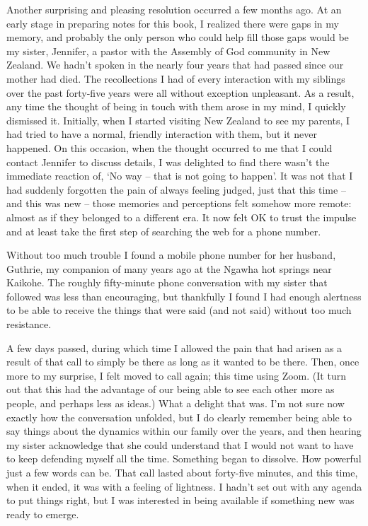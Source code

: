 Another surprising and pleasing resolution occurred a few months ago. At
an early stage in preparing notes for this book, I realized there were
gaps in my memory, and probably the only person who could help fill
those gaps would be my sister, Jennifer, a pastor with the Assembly of
God community in New Zealand. We hadn't spoken in the nearly four years
that had passed since our mother had died. The recollections I had of
every interaction with my siblings over the past forty-five years were
all without exception unpleasant. As a result, any time the thought of
being in touch with them arose in my mind, I quickly dismissed it.
Initially, when I started visiting New Zealand to see my parents, I had
tried to have a normal, friendly interaction with them, but it never
happened. On this occasion, when the thought occurred to me that I could
contact Jennifer to discuss details, I was delighted to find there
wasn't the immediate reaction of, `No way -- that is not going to
happen'. It was not that I had suddenly forgotten the pain of always
feeling judged, just that this time -- and this was new -- those
memories and perceptions felt somehow more remote: almost as if they
belonged to a different era. It now felt OK to trust the impulse and at
least take the first step of searching the web for a phone number.

Without too much trouble I found a mobile phone number for her husband,
Guthrie, my companion of many years ago at the Ngawha hot springs near
Kaikohe. The roughly fifty-minute phone conversation with my sister that
followed was less than encouraging, but thankfully I found I had enough
alertness to be able to receive the things that were said (and not said)
without too much resistance.

A few days passed, during which time I allowed the pain that had arisen
as a result of that call to simply be there as long as it wanted to be
there. Then, once more to my surprise, I felt moved to call again; this
time using Zoom.
(It turn out that this had the advantage of our being able to see each other
more as people, and perhaps less as ideas.)
What a delight that was. I'm not sure now exactly how the
conversation unfolded, but I do clearly remember being able to say
things about the dynamics within our family over the years, and then
hearing my sister acknowledge that she could understand that I would not
want to have to keep defending myself all the time. Something began to
dissolve. How powerful just a few words can be. That call lasted about
forty-five minutes, and this time, when it ended, it was with a feeling
of lightness. I hadn't set out with any agenda to put things right, but
I was interested in being available if something new was ready to
emerge.

